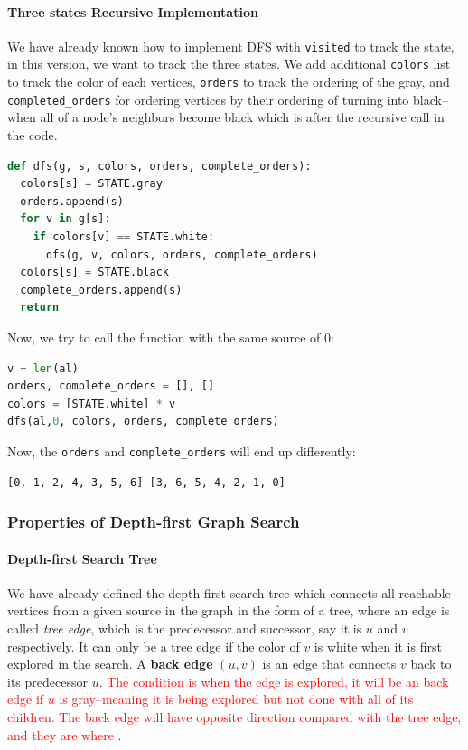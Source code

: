 \documentclass[main.tex]{subfiles}
\begin{document}
\paragraph{Three states Recursive Implementation} We have already known how to implement DFS with \texttt{visited} to track the state, in this version, we want to track the three states. 
We add additional \texttt{colors} list to track the color of each vertices, \texttt{orders} to track the ordering of the gray, and \texttt{completed\_orders} for ordering vertices by their ordering of turning into black--when all of a node's neighbors become black which is after the recursive call in the code.  
\begin{lstlisting}[language = Python]
def dfs(g, s, colors, orders, complete_orders):
  colors[s] = STATE.gray
  orders.append(s)
  for v in g[s]:
    if colors[v] == STATE.white:
      dfs(g, v, colors, orders, complete_orders)
  colors[s] = STATE.black
  complete_orders.append(s)
  return
\end{lstlisting}
Now, we try to call the function with the same source of 0:
\begin{lstlisting}[language=Python]
v = len(al)
orders, complete_orders = [], []
colors = [STATE.white] * v
dfs(al,0, colors, orders, complete_orders)
\end{lstlisting}
Now, the \texttt{orders} and \texttt{complete\_orders} will end up differently:
\begin{lstlisting}[numbers=none]
[0, 1, 2, 4, 3, 5, 6] [3, 6, 5, 4, 2, 1, 0]
\end{lstlisting}

\subsubsection{Properties of Depth-first Graph Search}

\paragraph{Depth-first Search Tree} We have already defined the depth-first search tree which connects all reachable vertices from a given source in the graph in the form of a tree, where an edge is called \textit{tree edge}, which is the predecessor and successor, say it is $u$ and $v$ respectively. It can only be a tree edge if the color of $v$ is white when it is first explored in the search. A \textbf{back edge} $(u, v)$ is an edge that connects $v$ back to its predecessor $u$. \textcolor{red}{The condition is when the edge is explored, it will be an back edge if $u$ is  gray--meaning it is being explored but not done with all of its children. The back edge will have opposite direction compared with the tree edge, and they are where }.
\end{document}

